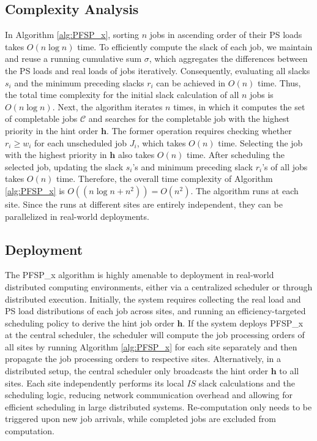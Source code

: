 \subsection{Complexity Analysis}
In Algorithm \ref{alg:PFSP_x}, sorting $n$ jobs in ascending order of their PS loads takes $O(n\log n)$ time. To efficiently compute the slack of each job, we maintain and reuse a running cumulative sum $\sigma$, which aggregates the differences between the PS loads and real loads of jobs iteratively. Consequently, evaluating all slacks $s_i$ and the minimum preceding slacks $r_i$ can be achieved in $O(n)$ time. Thus, the total time complexity for the initial slack calculation of all $n$ jobs is $O(n \log n)$. Next, the algorithm iterates $n$ times, in which it computes the set of completable jobs $\mathcal{C}$ and searches for the completable job with the highest priority in the hint order $\mathbf{h}$. The former operation requires checking whether $r_i \ge w_i$ for each unscheduled job $J_i$, which takes $O(n)$ time. Selecting the job with the highest priority in $\mathbf{h}$ also takes $O(n)$ time. After scheduling the selected job, updating the slack $s_i$'s and minimum preceding slack $r_i$'s of all jobs takes $O(n)$ time. Therefore, the overall time complexity of Algorithm \ref{alg:PFSP_x} is $O((n \log n + n^2)) = O(n^2)$. The algorithm runs at each site. Since the runs at different sites are entirely independent, they can be parallelized in real-world deployments.%

\subsection{Deployment}
\label{sec:deploy}
The PFSP\_x algorithm is highly amenable to deployment in real-world distributed computing environments, either via a centralized scheduler or through distributed execution. Initially, the system requires collecting the real load and PS load distributions of each job across sites, and running an efficiency-targeted scheduling policy to derive the hint job order $\mathbf{h}$. If the system deploys PFSP\_x at the central scheduler, the scheduler will compute the job processing orders of all sites by running Algorithm \ref{alg:PFSP_x} for each site separately and then propagate the job processing orders to respective sites. Alternatively, in a distributed setup, the central scheduler only broadcasts the hint order $\mathbf{h}$ to all sites. Each site independently performs its local $IS$ slack calculations and the scheduling logic, reducing network communication overhead and allowing for efficient scheduling in large distributed systems. Re-computation only needs to be triggered upon new job arrivals, while completed jobs are excluded from computation.


